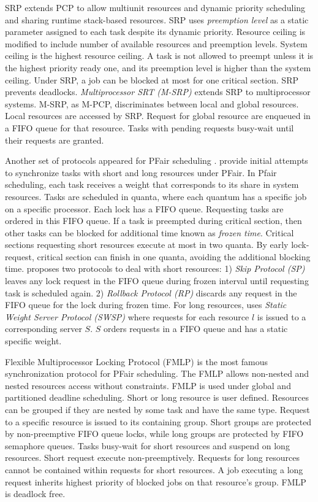 \documentclass[12pt,english]{report}
\begin{document}
SRP \cite{Buttazzo:2004:HRC:1027504,baker1991stack,990598} extends
PCP to allow multiunit resources and dynamic priority scheduling and
sharing runtime stack-based resources. SRP uses \textit{preemption
level} as a static parameter assigned to each task despite its dynamic
priority. Resource ceiling is modified to include number of available
resources and preemption levels. System ceiling is the highest resource
ceiling. A task is not allowed to preempt unless it is the highest
priority ready one, and its preemption level is higher than the system
ceiling. Under SRP, a job can be blocked at most for one critical
section. SRP prevents deadlocks. \textit{Multiprocessor SRT (M-SRP)}
\cite{gai2003comparison} extends SRP to multiprocessor systems. M-SRP,
as M-PCP, discriminates between local and global resources. Local
resources are accessed by SRP. Request for global resource are enqueued
in a FIFO queue for that resource. Tasks with pending requests busy-wait
until their requests are granted.

Another set of protocols appeared for PFair scheduling \cite{key-4}.
\cite{1181570} provide initial attempts to synchronize tasks with
short and long resources under PFair. In Pfair scheduling, each task
receives a weight that corresponds to its share in system resources.
Tasks are scheduled in quanta, where each quantum has a specific job
on a specific processor. Each lock has a FIFO queue. Requesting tasks
are ordered in this FIFO queue. If a task is preempted during critical
section, then other tasks can be blocked for additional time known
as \textit{frozen time}. Critical sections requesting short resources
execute at most in two quanta. By early lock-request, critical section
can finish in one quanta, avoiding the additional blocking time. \cite{1181570}
proposes two protocols to deal with short resources: 1)\textit{ Skip
Protocol (SP) }leaves any lock request in the FIFO queue during frozen
interval until requesting task is scheduled again. 2) \textit{Rollback
Protocol (RP)} discards any request in the FIFO queue for the lock
during frozen time. For long resources, \cite{1181570} uses \textit{Static
Weight Server Protocol (SWSP)} where requests for each resource $l$
is issued to a corresponding server $S$. $S$ orders requests in
a FIFO queue and has a static specific weight.

Flexible Multiprocessor Locking Protocol (FMLP) \cite{key-4} is the
most famous synchronization protocol for PFair scheduling. The FMLP
allows non-nested and nested resources access without constraints.
FMLP is used under global and partitioned deadline scheduling. Short
or long resource is user defined. Resources can be grouped if they
are nested by some task and have the same type. Request to a specific
resource is issued to its containing group. Short groups are protected
by non-preemptive FIFO queue locks, while long groups are protected
by FIFO semaphore queues. Tasks busy-wait for short resources and
suspend on long resources. Short request execute non-preemptively.
Requests for long resources cannot be contained within requests for
short resources. A job executing a long request inherits highest priority
of blocked jobs on that resource's group. FMLP is deadlock free.
\end{document}
